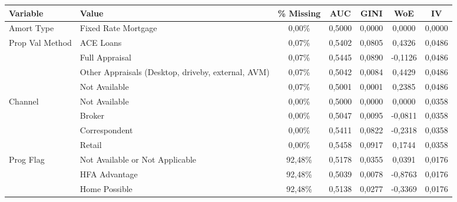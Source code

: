 {
\footnotesize

\begin{longtable}{ p{3cm} p{4cm} c c c c c}\toprule      
\textbf{Variable}           & \textbf{Value}                                     & \textbf{\% Missing} & \textbf{AUC}    & \textbf{GINI}  & \textbf{WoE} & \textbf{IV}  \\\midrule
Amort Type                  & Fixed Rate Mortgage                                               & 0,00\%  & 0,5000 & 0,0000 & 0,0000  & 0,0000 \\\hline
Prop Val Method             & ACE Loans                                                         & 0,07\%  & 0,5402 & 0,0805 & 0,4326  & 0,0486 \\
                            & Full Appraisal                                                    & 0,07\%  & 0,5445 & 0,0890 & -0,1126 & 0,0486 \\
                            & Other Appraisals (Desktop, driveby, external, AVM)                & 0,07\%  & 0,5042 & 0,0084 & 0,4429  & 0,0486 \\
                            & Not Available                                                     & 0,07\%  & 0,5001 & 0,0001 & 0,2385  & 0,0486 \\\hline
Channel                     & Not Available                                                     & 0,00\%  & 0,5000 & 0,0000 & 0,0000  & 0,0358 \\
                            & Broker                                                            & 0,00\%  & 0,5047 & 0,0095 & -0,0811 & 0,0358 \\
                            & Correspondent                                                     & 0,00\%  & 0,5411 & 0,0822 & -0,2318 & 0,0358 \\
                            & Retail                                                            & 0,00\%  & 0,5458 & 0,0917 & 0,1744  & 0,0358 \\\hline
Prog Flag                   & Not Available or Not Applicable                                   & 92,48\% & 0,5178 & 0,0355 & 0,0391  & 0,0176 \\
                            & HFA Advantage                                                     & 92,48\% & 0,5039 & 0,0078 & -0,8763 & 0,0176 \\
                            & Home Possible                                                     & 92,48\% & 0,5138 & 0,0277 & -0,3369 & 0,0176 \\\hline

\end{longtable}}
